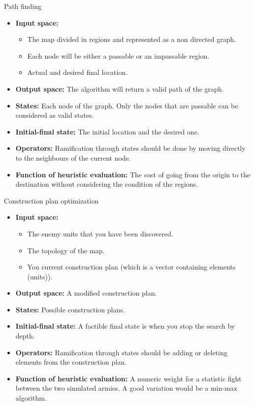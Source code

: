\documentclass[10pt]{beamer}
\begin{document}
	     
	      \begin{frame}{Path finding}
	      \small
	           \begin{itemize}
		    \item \textbf{Input space:}
		      \begin{itemize}
			 \footnotesize
			 \item The map divided in regions and represented as a non directed graph.
			 \item Each node will be either a passable or an impassable region.
			 \item Actual and desired final location.
		      \end{itemize}
		    \item \textbf{Output space:} The algorithm will return a valid path of the graph.
		    \item \textbf{States:} Each node of the graph. Only the nodes that are passable can be considered as valid states. 
		    \item \textbf{Initial-final state:} The initial location and the desired one.
		    \item \textbf{Operators:} Ramification through states should be done by moving directly to the neighbours of the current node.
		    \item \textbf{Function of heuristic evaluation:} The cost of going from the origin to the destination without considering the condition of the regions.
		   \end{itemize}
	      \end{frame}

	      \begin{frame}{Construction plan optimization}
	      \small
	           \begin{itemize}
		    \item \textbf{Input space:}
		      \begin{itemize}
			 \footnotesize
			 \item The enemy units that you have been discovered.
			 \item The topology of the map.
			 \item You current construction plan (which is a vector containing elements (units)).
		      \end{itemize}
		    \item \textbf{Output space:} A modified construction plan.
		    \item \textbf{States:} Possible construction plans. 
		    \item \textbf{Initial-final state:} A factible final state is when you stop the search by depth.
		    \item \textbf{Operators:} Ramification through states should be adding or deleting elements from the construction plan.
		    \item \textbf{Function of heuristic evaluation:} A numeric weight for a statistic fight between the two simulated armies. A good variation would be a min-max algorithm.
		   \end{itemize}
	      \end{frame}
\end{document}
